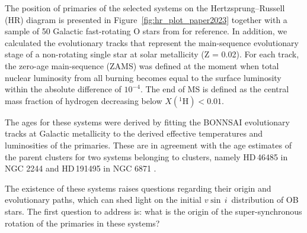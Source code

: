 \documentclass{aa}
\newcommand{\vsini} {$v\sin\,i$}
\DeclareRobustCommand{\Figref}[1]{Figure~\ref{#1}}
\begin{document}
The position of primaries of the selected systems on the Hertzsprung--Russell (HR)
diagram is presented in \Figref{fig:hr_plot_paper2023} together
with a sample of 50 Galactic fast-rotating O stars from \citet{Britavskiy_2023} for reference.
In addition, we calculated the evolutionary tracks that represent the main-sequence evolutionary stage of a non-rotating single star at solar metallicity (Z = 0.02).
For each track, the zero-age main-sequence (ZAMS) was defined at the moment when total nuclear luminosity from all burning becomes equal to the surface luminosity within the absolute difference of $10^{-4}$.
The end of MS is defined as the central mass fraction of hydrogen decreasing below $X(^{1}\mathrm{H})<0.01$.


The ages for these systems were
derived by fitting the BONNSAI evolutionary tracks \citep{Bonnsai_2014} at Galactic
metallicity to the derived effective temperatures and luminosities of
the primaries. These are in agreement with the age estimates of the
parent clusters for two systems belonging to clusters, namely
HD\,46485 in NGC 2244 and HD\,191495 in NGC 6871 \citep[see for details][]{Naze_2023_rot}.

The existence of these systems raises questions regarding
their origin and evolutionary paths, which can shed light on the initial
\vsini~distribution of OB stars. The first question to address is: what is the origin of the super-synchronous rotation of the primaries in these systems?
\end{document}
